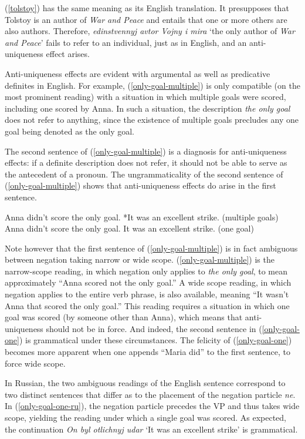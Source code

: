 \documentclass{article}
\begin{document}
(\ref{tolstoy}) has the same meaning as its English translation. It presupposes that Tolstoy is an author of \textit{War and Peace} and entails that one or more others are also authors. Therefore, \textit{edinstvennyj avtor Vojny i mira} `the only author of \textit{War and Peace}' fails to refer to an individual, just as in English, and an anti-uniqueness effect arises.

Anti-uniqueness effects are evident with argumental as well as predicative definites in English. For example, (\ref{only-goal-multiple}) is only compatible (on the most prominent reading) with a situation in which multiple goals were scored, including one scored by Anna. In such a situation, the description \textit{the only goal} does not refer to anything, since the existence of multiple goals precludes any one goal being denoted as the only goal.

The second sentence of (\ref{only-goal-multiple}) is a diagnosis for anti-uniqueness effects: if a definite description does not refer, it should not be able to serve as the antecedent of a pronoun. The ungrammaticality of the second sentence of (\ref{only-goal-multiple}) shows that anti-uniqueness effects do arise in the first sentence.

\begin{exe}
	\ex \label{only-goal-multiple} Anna didn't score the only goal. *It was an excellent strike. (multiple goals)
	\ex \label{only-goal-one} Anna didn't score the only goal. It was an excellent strike. (one goal)
\end{exe}

Note however that the first sentence of (\ref{only-goal-multiple}) is in fact ambiguous between negation taking narrow or wide scope. (\ref{only-goal-multiple}) is the narrow-scope reading, in which negation only applies to \textit{the only goal}, to mean approximately ``Anna scored not the only goal.'' A wide scope reading, in which negation applies to the entire verb phrase, is also available, meaning ``It wasn't Anna that scored the only goal.'' This reading requires a situation in which one goal was scored (by someone other than Anna), which means that anti-uniqueness should not be in force. And indeed, the second sentence in (\ref{only-goal-one}) is grammatical under these circumstances. The felicity of (\ref{only-goal-one}) becomes more apparent when one appends ``Maria did'' to the first sentence, to force wide scope.

In Russian, the two ambiguous readings of the English sentence correspond to two distinct sentences that differ as to the placement of the negation particle \textit{ne}. In (\ref{only-goal-one-ru}), the negation particle precedes the VP and thus takes wide scope, yielding the reading under which a single goal was scored. As expected, the continuation \textit{On byl otlichnyj udar} `It was an excellent strike' is grammatical.
\end{document}
